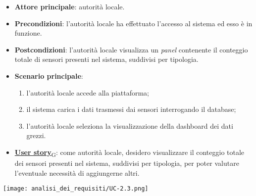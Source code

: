 \begin{itemize}
	\item \textbf{Attore principale}: autorità locale.
	\item \textbf{Precondizioni}: l'autorità locale ha effettuato l'accesso al sistema ed esso è in funzione.
	\item \textbf{Postcondizioni}: l'autorità locale visualizza un \textit{panel} contenente il conteggio totale di sensori presenti nel sistema, suddivisi per tipologia.
	\item \textbf{Scenario principale}:
	      \begin{enumerate}
		      \item l'autorità locale accede alla piattaforma;
		      \item il sistema carica i dati trasmessi dai sensori interrogando il database;
		      \item l'autorità locale seleziona la visualizzazione della dashboard dei dati grezzi.
	      \end{enumerate}
	\item \href{https://7last.github.io/docs/rtb/documentazione-interna/glossario\#user-story}{\textbf{User story}\textsubscript{G}}:
	      come autorità locale, desidero visualizzare il conteggio totale dei sensori presenti nel sistema, suddivisi per tipologia, per poter valutare l'eventuale necessità di aggiungerne altri.
\end{itemize}
\begin{center}
	\texttt{[image: analisi\_dei\_requisiti/UC-2.3.png]}
\end{center}

